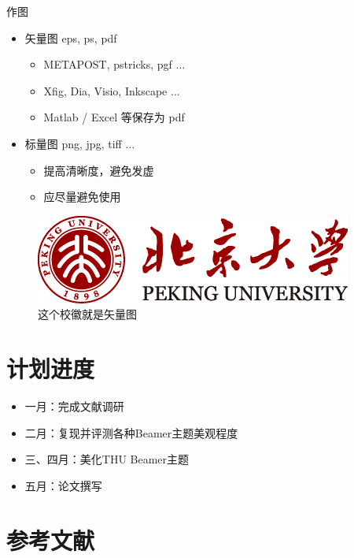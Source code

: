 \documentclass[10pt]{beamer}
\begin{document}
\begin{frame}{作图}
    \begin{itemize}
        \item 矢量图 eps, ps, pdf
        \begin{itemize}
            \item METAPOST, pstricks, pgf $\ldots$
            \item Xfig, Dia, Visio, Inkscape $\ldots$
            \item Matlab / Excel 等保存为 pdf
        \end{itemize}
        \item 标量图 png, jpg, tiff $\ldots$
        \begin{itemize}
            \item 提高清晰度，避免发虚
            \item 应尽量避免使用
        \end{itemize}
    \end{itemize}
    \begin{figure}[htpb]
        \centering
        \includegraphics[width=0.2\linewidth]{logo_large.png}
        \caption{这个校徽就是矢量图}
    \end{figure}
\end{frame}

\section{计划进度}
\begin{frame}
    \begin{itemize}
        \item 一月：完成文献调研
        \item 二月：复现并评测各种Beamer主题美观程度
        \item 三、四月：美化THU Beamer主题
        \item 五月：论文撰写
    \end{itemize}
\end{frame}

\section{参考文献}

\begin{frame}[allowframebreaks]
    
    
\end{frame}
\end{document}
